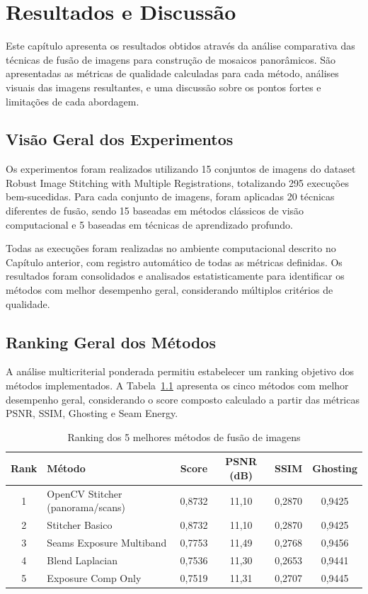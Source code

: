 \chapter{Resultados e Discussão}

Este capítulo apresenta os resultados obtidos através da análise comparativa das técnicas de fusão de imagens para construção de mosaicos panorâmicos. São apresentadas as métricas de qualidade calculadas para cada método, análises visuais das imagens resultantes, e uma discussão sobre os pontos fortes e limitações de cada abordagem.

\section{Visão Geral dos Experimentos}

Os experimentos foram realizados utilizando 15 conjuntos de imagens do dataset Robust Image Stitching with Multiple Registrations, totalizando 295 execuções bem-sucedidas. Para cada conjunto de imagens, foram aplicadas 20 técnicas diferentes de fusão, sendo 15 baseadas em métodos clássicos de visão computacional e 5 baseadas em técnicas de aprendizado profundo.

Todas as execuções foram realizadas no ambiente computacional descrito no Capítulo anterior, com registro automático de todas as métricas definidas. Os resultados foram consolidados e analisados estatisticamente para identificar os métodos com melhor desempenho geral, considerando múltiplos critérios de qualidade.

\section{Ranking Geral dos Métodos}

A análise multicriterial ponderada permitiu estabelecer um ranking objetivo dos métodos implementados. A Tabela~\ref{tab:top5} apresenta os cinco métodos com melhor desempenho geral, considerando o score composto calculado a partir das métricas PSNR, SSIM, Ghosting e Seam Energy.

\begin{table}[htb]
\centering
\caption{Ranking dos 5 melhores métodos de fusão de imagens}
\label{tab:top5}
\small
\begin{tabular}{clcccc}
\hline
\textbf{Rank} & \textbf{Método} & \textbf{Score} & \textbf{PSNR (dB)} & \textbf{SSIM} & \textbf{Ghosting} \\ \hline
1 & OpenCV Stitcher (panorama/scans) & 0,8732 & 11,10 & 0,2870 & 0,9425 \\
2 & Stitcher Basico & 0,8732 & 11,10 & 0,2870 & 0,9425 \\
3 & Seams Exposure Multiband & 0,7753 & 11,49 & 0,2768 & 0,9456 \\
4 & Blend Laplacian & 0,7536 & 11,30 & 0,2653 & 0,9441 \\
5 & Exposure Comp Only & 0,7519 & 11,31 & 0,2707 & 0,9445 \\
\hline
\end{tabular}
\end{table}

